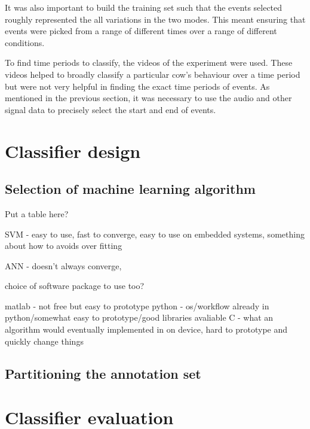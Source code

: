 It was also important to build the training set such that the events selected roughly represented the all variations in the two modes. This meant ensuring that events were picked from a range of different times over a range of different conditions.

To find time periods to classify, the videos of the experiment were used. These videos helped to broadly classify a particular cow's behaviour over a time period but were not very helpful in finding the exact time periods of events. As mentioned in the previous section, it was necessary to use the audio and other signal data to precisely select the start and end of events. 

\section{Classifier design}

\subsection{Selection of machine learning algorithm}

Put a table here?

SVM - easy to use, fast to converge, easy to use on embedded systems, something about how to avoids over fitting

ANN - doesn't always converge, 


choice of software package to use too?

matlab - not free but easy to prototype
python - os/workflow already in python/somewhat easy to prototype/good libraries avaliable
C - what an algorithm would eventually implemented in on device, hard to prototype and quickly change things


\subsection{Partitioning the annotation set}

\section{Classifier evaluation}
